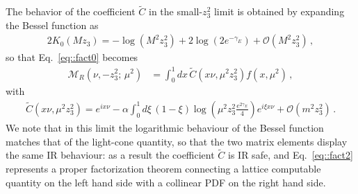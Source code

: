 The behavior of the coefficient $\tilde{C}$ in the small-$z_3^2$ limit is
obtained by expanding the Bessel function as 
\begin{align}
	\label{eq::besselexpansion}
	2K_0\left(M z_3\right) = - \log\left(M^2 z_3^2\right) + 2 \log\left(2e^{-\gamma_E}\right) + \mathcal{O}\left(M^2 z_3^2\right)\, ,
\end{align} 
so that Eq.~\eqref{eq::fact0} becomes
\begin{align}
	\label{eq::fact2}
	\mathcal{M}_R\left(\nu, -z_3^2; \, \mu^2\right) &=  
	\int_{0}^{1} dx \, \tilde{C}\left(x\nu,\mu^2 z_3^2 \right) 
	f\left(x,\mu^2\right)\, ,
\end{align}
with
\begin{align}
	\label{eq::Cpseudo0}
	\tilde{C}\left(x\nu,\mu^2 z_3^2 \right) =
	 e^{i x\nu} - \alpha\int_0^1 d\xi \, 
	 \left(1-\xi\right) 
	 \log\left( \mu^2 z_3^2\frac{e^{2\gamma_E}}{4} \right) e^{i \xi x\nu}
	 + \mathcal{O}\left(m^2 z_3^2\right)\, .
\end{align}
We note that in this limit the logarithmic behaviour of the Bessel function
matches that of the light-cone quantity, so that the two matrix elements display
the same IR behaviour: as a result the coefficient $\tilde{C}$ is IR safe, and
Eq.~\eqref{eq::fact2} represents a proper factorization theorem connecting a
lattice computable quantity on the left hand side with a collinear PDF on the
right hand side. 

